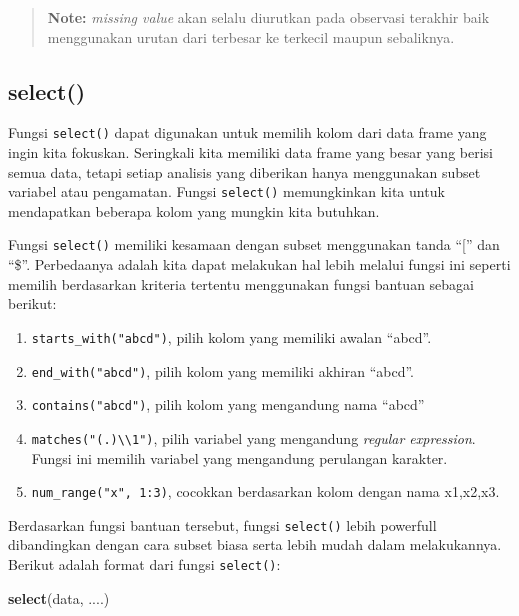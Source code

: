 \documentclass[]{book}
\newenvironment{Shaded}{\begin{snugshade}}{\end{snugshade}}
\newcommand{\KeywordTok}[1]{\textcolor[rgb]{0.13,0.29,0.53}{\textbf{#1}}}
\newcommand{\NormalTok}[1]{#1}
\providecommand{\tightlist}{%
  \setlength{\itemsep}{0pt}\setlength{\parskip}{0pt}}
\begin{document}
\begin{quote}
\textbf{Note: } \emph{missing value} akan selalu diurutkan pada
observasi terakhir baik menggunakan urutan dari terbesar ke terkecil
maupun sebaliknya.
\end{quote}

\subsection{select()}\label{select}

Fungsi \texttt{select()} dapat digunakan untuk memilih kolom dari data
frame yang ingin kita fokuskan. Seringkali kita memiliki data frame yang
besar yang berisi semua data, tetapi setiap analisis yang diberikan
hanya menggunakan subset variabel atau pengamatan. Fungsi
\texttt{select()} memungkinkan kita untuk mendapatkan beberapa kolom
yang mungkin kita butuhkan.

Fungsi \texttt{select()} memiliki kesamaan dengan subset menggunakan
tanda ``{[}'' dan ``\$''. Perbedaanya adalah kita dapat melakukan hal
lebih melalui fungsi ini seperti memilih berdasarkan kriteria tertentu
menggunakan fungsi bantuan sebagai berikut:

\begin{enumerate}
\def\labelenumi{\arabic{enumi}.}
\tightlist
\item
  \texttt{starts\_with("abcd")}, pilih kolom yang memiliki awalan
  ``abcd''.
\item
  \texttt{end\_with("abcd")}, pilih kolom yang memiliki akhiran
  ``abcd''.
\item
  \texttt{contains("abcd")}, pilih kolom yang mengandung nama ``abcd''
\item
  \texttt{matches("(.)\textbackslash{}\textbackslash{}1")}, pilih
  variabel yang mengandung \emph{regular expression}. Fungsi ini memilih
  variabel yang mengandung perulangan karakter.
\item
  \texttt{num\_range("x",\ 1:3)}, cocokkan berdasarkan kolom dengan nama
  x1,x2,x3.
\end{enumerate}

Berdasarkan fungsi bantuan tersebut, fungsi \texttt{select()} lebih
powerfull dibandingkan dengan cara subset biasa serta lebih mudah dalam
melakukannya. Berikut adalah format dari fungsi \texttt{select()}:

\begin{Shaded}
\begin{Highlighting}[]
\KeywordTok{select}\NormalTok{(data, ....)}
\end{Highlighting}
\end{Shaded}
\end{document}
